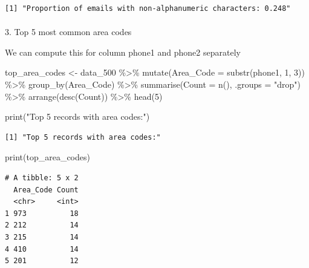 \documentclass[
  12pt,
]{article}
\makeatletter
\let\oldparagraph\paragraph
\renewcommand{\paragraph}{
    \@ifstar
      \xxxParagraphStar
      \xxxParagraphNoStar
  }
\newcommand{\xxxParagraphStar}[1]{\oldparagraph*{#1}\mbox{}}
\newcommand{\xxxParagraphNoStar}[1]{\oldparagraph{#1}\mbox{}}
\newenvironment{Shaded}{\begin{snugshade}}{\end{snugshade}}
\newcommand{\AttributeTok}[1]{\textcolor[rgb]{0.40,0.45,0.13}{#1}}
\newcommand{\DecValTok}[1]{\textcolor[rgb]{0.68,0.00,0.00}{#1}}
\newcommand{\FunctionTok}[1]{\textcolor[rgb]{0.28,0.35,0.67}{#1}}
\newcommand{\NormalTok}[1]{\textcolor[rgb]{0.00,0.23,0.31}{#1}}
\newcommand{\OtherTok}[1]{\textcolor[rgb]{0.00,0.23,0.31}{#1}}
\newcommand{\SpecialCharTok}[1]{\textcolor[rgb]{0.37,0.37,0.37}{#1}}
\newcommand{\StringTok}[1]{\textcolor[rgb]{0.13,0.47,0.30}{#1}}
\makeatother
\begin{document}
\begin{verbatim}
[1] "Proportion of emails with non-alphanumeric characters: 0.248"
\end{verbatim}

\paragraph{3. Top 5 most common area
codes}\label{top-5-most-common-area-codes}

We can compute this for column phone1 and phone2 separately

\begin{Shaded}
\begin{Highlighting}[]
\NormalTok{top\_area\_codes }\OtherTok{\textless{}{-}}\NormalTok{ data\_500 }\SpecialCharTok{\%\textgreater{}\%}
  \FunctionTok{mutate}\NormalTok{(}\AttributeTok{Area\_Code =} \FunctionTok{substr}\NormalTok{(phone1, }\DecValTok{1}\NormalTok{, }\DecValTok{3}\NormalTok{)) }\SpecialCharTok{\%\textgreater{}\%}  
  \FunctionTok{group\_by}\NormalTok{(Area\_Code) }\SpecialCharTok{\%\textgreater{}\%}                        
  \FunctionTok{summarise}\NormalTok{(}\AttributeTok{Count =} \FunctionTok{n}\NormalTok{(), }\AttributeTok{.groups =} \StringTok{"drop"}\NormalTok{) }\SpecialCharTok{\%\textgreater{}\%}  
  \FunctionTok{arrange}\NormalTok{(}\FunctionTok{desc}\NormalTok{(Count)) }\SpecialCharTok{\%\textgreater{}\%}                       
  \FunctionTok{head}\NormalTok{(}\DecValTok{5}\NormalTok{)                                        }

\FunctionTok{print}\NormalTok{(}\StringTok{"Top 5 records with area codes:"}\NormalTok{)}
\end{Highlighting}
\end{Shaded}

\begin{verbatim}
[1] "Top 5 records with area codes:"
\end{verbatim}

\begin{Shaded}
\begin{Highlighting}[]
\FunctionTok{print}\NormalTok{(top\_area\_codes)}
\end{Highlighting}
\end{Shaded}

\begin{verbatim}
# A tibble: 5 x 2
  Area_Code Count
  <chr>     <int>
1 973          18
2 212          14
3 215          14
4 410          14
5 201          12
\end{verbatim}
\end{document}
